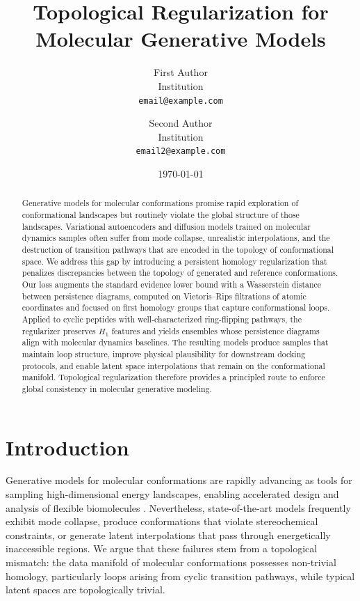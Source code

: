 \documentclass[11pt]{article}
\title{Topological Regularization for Molecular Generative Models}
\author{First Author\\Institution\\\texttt{email@example.com} \and Second Author\\Institution\\\texttt{email2@example.com}}
\date{\today}
\theoremstyle{definition}
\begin{document}
\maketitle

\begin{abstract}
Generative models for molecular conformations promise rapid exploration of conformational landscapes but routinely violate the global structure of those landscapes. Variational autoencoders and diffusion models trained on molecular dynamics samples often suffer from mode collapse, unrealistic interpolations, and the destruction of transition pathways that are encoded in the topology of conformational space. We address this gap by introducing a persistent homology regularization that penalizes discrepancies between the topology of generated and reference conformations. Our loss augments the standard evidence lower bound with a Wasserstein distance between persistence diagrams, computed on Vietoris--Rips filtrations of atomic coordinates and focused on first homology groups that capture conformational loops. Applied to cyclic peptides with well-characterized ring-flipping pathways, the regularizer preserves $H_1$ features and yields ensembles whose persistence diagrams align with molecular dynamics baselines. The resulting models produce samples that maintain loop structure, improve physical plausibility for downstream docking protocols, and enable latent space interpolations that remain on the conformational manifold. Topological regularization therefore provides a principled route to enforce global consistency in molecular generative modeling.
\end{abstract}

\section{Introduction}
Generative models for molecular conformations are rapidly advancing as tools for sampling high-dimensional energy landscapes, enabling accelerated design and analysis of flexible biomolecules \cite{noe2019boltzmann, trippe2023diffusion}. Nevertheless, state-of-the-art models frequently exhibit mode collapse, produce conformations that violate stereochemical constraints, or generate latent interpolations that pass through energetically inaccessible regions. We argue that these failures stem from a topological mismatch: the data manifold of molecular conformations possesses non-trivial homology, particularly loops arising from cyclic transition pathways, while typical latent spaces are topologically trivial.
\end{document}
